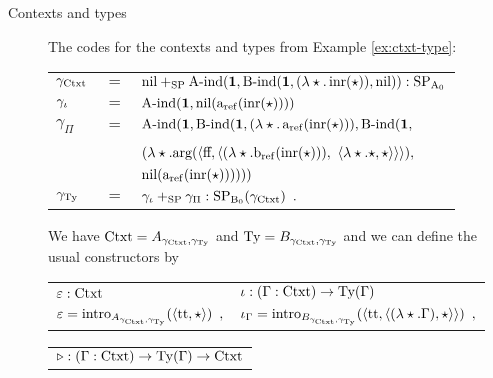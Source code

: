 \documentclass{article}
\begin{document}
\begin{description}







\item[Contexts and types]

The codes for the contexts and types from Example \ref{ex:ctxt-type}: \vskip
0.2cm
\begin{tabular}{lcl}
$\gamma_{\text{Ctxt}}$ &$=$& $\text{nil} +_{\text{SP}} \text{A-ind}(\mathbf{1}, \text{B-ind}(\mathbf{1}, (\lambda \star .\,\text{inr}(\star)),
\text{nil})) : \text{SP}_{\mathrm{A}_0}$ \\
$\gamma_{\iota}$ &$=$& $\text{A-ind}(\mathbf{1}, \text{nil}(\text{a}_{\mathrm{ref}}(\text{inr}(\star))))$ \\
$\gamma_{\Pi}$ &$=$& $\text{A-ind}(\mathbf{1}, \text{B-ind}(\mathbf{1}, (\lambda \star.\,\text{a}_{\mathrm{ref}}(\text{inr}(\star))),\text{B-ind}(\mathbf{1},$ \\
&& \qquad\quad $(\lambda \star.\text{arg}(\langle \text{ff}, \langle (\lambda
\star.\text{b}_{\mathrm{ref}}(\text{inr}(\star))),$ 
 $\langle \lambda \star.\star, \star\rangle\rangle\rangle),$ \\
&& \qquad\qquad $\text{nil}(\text{a}_{\mathrm{ref}}(\text{inr}(\star))))))$ \\
$\gamma_{\text{Ty}}$ &$=$& $\gamma_{\iota} +_{\text{SP}} \gamma_{\Pi} : \text{SP}_{\mathrm{B}_0}(\gamma_{\text{Ctxt}})\enspace .$
\end{tabular}
\vskip 0.2cm \noindent
We have $\text{Ctxt} = A_{\gamma_{\text{Ctxt}}, \gamma_{\text{Ty}}}$ and $\text{Ty} =
B_{\gamma_{\text{Ctxt}}, \gamma_{\text{Ty}}}$
and we can define the usual constructors by
\vskip 0.2cm
\begin{tabular}{l@{\qquad\qquad}l}
  $\varepsilon : \text{Ctxt}$ & $\iota : (\Gamma : \text{Ctxt}) \to \text{Ty}(\Gamma)$ \\
  $\varepsilon = \text{intro}_{A_{\gamma_{\text{Ctxt}}, \gamma_{\text{Ty}}}}(\langle \text{tt}, \star\rangle)\enspace ,$ & $\iota_{\Gamma} = \text{intro}_{B_{\gamma_{\text{Ctxt}}, \gamma_{\text{Ty}}}}(\langle \text{tt}, \langle (\lambda \star.\Gamma), \star\rangle\rangle)\enspace ,$\\
\end{tabular}
\vskip 0.2cm
\begin{tabular}{l}
  $\triangleright : (\Gamma : \text{Ctxt}) \to \text{Ty}(\Gamma) \to \text{Ctxt}$ \\

\end{tabular}
\end{description}
\end{document}
